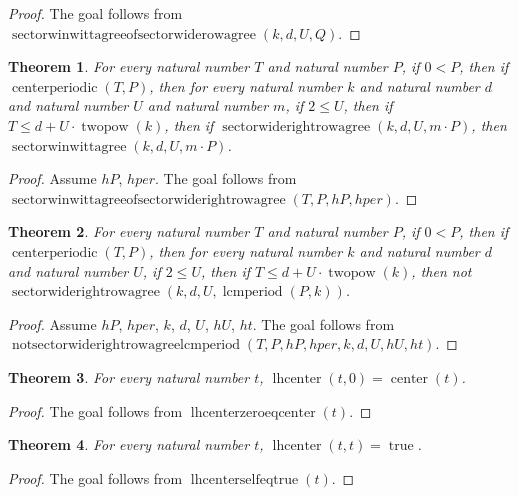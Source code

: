 \documentclass[11pt]{article}
\newtheorem{theorem}{Theorem}[section]
\theoremstyle{definition}
\begin{document}
\begin{proof}
The goal follows from \(\operatorname{sectorwinwittagreeofsectorwiderowagree}(k, d, U, Q)\).
\end{proof}
\begin{theorem}
\label{ll:paper:sectorwinwittagree-of-sectorwiderightrowagree}
For every natural number \(T\) and natural number \(P\), if \(0 < P\), then if \(\operatorname{centerperiodic}(T, P)\), then for every natural number \(k\) and natural number \(d\) and natural number \(U\) and natural number \(m\), if \(2 \le U\), then if \(T \le d + U \cdot \operatorname{twopow}(k)\), then if \(\operatorname{sectorwiderightrowagree}(k, d, U, m \cdot P)\), then \(\operatorname{sectorwinwittagree}(k, d, U, m \cdot P)\).
\end{theorem}
\begin{proof}
Assume \(hP\), \(hper\).
The goal follows from \(\operatorname{sectorwinwittagreeofsectorwiderightrowagree}(T, P, hP, hper)\).
\end{proof}
\begin{theorem}
\label{ll:paper:not-sectorwiderightrowagree-lcmperiod}
For every natural number \(T\) and natural number \(P\), if \(0 < P\), then if \(\operatorname{centerperiodic}(T, P)\), then for every natural number \(k\) and natural number \(d\) and natural number \(U\), if \(2 \le U\), then if \(T \le d + U \cdot \operatorname{twopow}(k)\), then not \(\operatorname{sectorwiderightrowagree}(k, d, U, \operatorname{lcmperiod}(P, k))\).
\end{theorem}
\begin{proof}
Assume \(hP\), \(hper\), \(k\), \(d\), \(U\), \(hU\), \(ht\).
The goal follows from \(\operatorname{notsectorwiderightrowagreelcmperiod}(T, P, hP, hper, k, d, U, hU, ht)\).
\end{proof}
\begin{theorem}
\label{ll:paper:lhcenter-zero-eq-center}
For every natural number \(t\), \(\operatorname{lhcenter}(t, 0) = \operatorname{center}(t)\).
\end{theorem}
\begin{proof}
The goal follows from \(\operatorname{lhcenterzeroeqcenter}(t)\).
\end{proof}
\begin{theorem}
\label{ll:paper:lhcenter-self-eq-true}
For every natural number \(t\), \(\operatorname{lhcenter}(t, t) = \operatorname{true}\).
\end{theorem}
\begin{proof}
The goal follows from \(\operatorname{lhcenterselfeqtrue}(t)\).
\end{proof}
\end{document}
